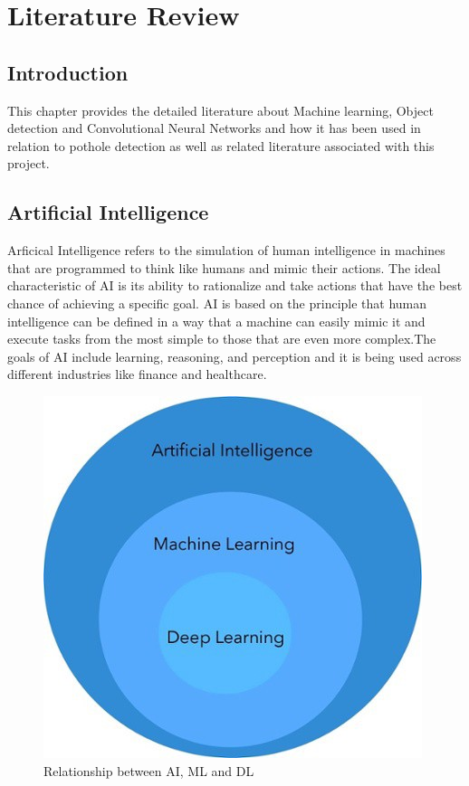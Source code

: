 \documentclass[12pt]{report}
\begin{document}
\chapter{Literature Review}

\section{Introduction}
This chapter provides the detailed literature about Machine learning, Object detection and Convolutional Neural Networks  and how it has been used in relation to pothole detection as well as related literature associated with this project.

\section{Artificial Intelligence}
Arficical Intelligence refers to the simulation of human intelligence in machines that are programmed to think like humans and mimic their actions. The ideal characteristic of AI is its ability to rationalize and take actions that have the best chance of achieving a specific goal. AI is based on the principle that human intelligence can be defined in a way that a machine can easily mimic it and execute tasks from the most simple to those that are even more complex.The goals of AI include learning, reasoning, and perception and it is being used across different industries like finance and healthcare\cite{AI}. 

\begin{figure}[H]\includegraphics[scale=0.7]{ML.jpeg}\centering\caption{Relationship between AI, ML and DL \cite{Difference}} \label{fig:AI, ML, DL} \end{figure}
\end{document}
